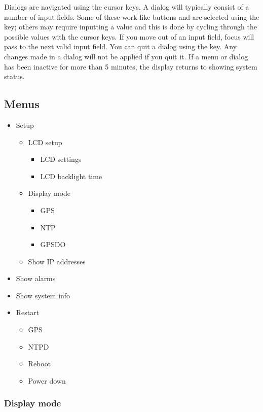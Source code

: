 Dialogs are navigated using the cursor keys. A dialog will typically consist of a number of input fields. Some of these work like buttons and are selected using the  key; others may require inputting a value and this is done by cycling through the possible values with the cursor keys. If you move out of an input field, focus will pass to the next valid input field. You can quit a dialog using the  key. Any changes made in a dialog will not be applied if you quit it. If a menu or dialog has been inactive for more than 5 minutes, the display returns
to showing system status.

\subsection{Menus}

\begin{itemize}
	\item Setup
		\begin{itemize}
			\item LCD setup
				\begin{itemize}
					\item LCD settings
					\item LCD backlight time
				\end{itemize}
			\item Display mode
				\begin{itemize}
					\item GPS
					\item NTP
					\item GPSDO
				\end{itemize}
			\item Show IP addresses
		\end{itemize}
		
	\item Show alarms
	\item Show system info
	\item Restart
		\begin{itemize}
			\item GPS
			\item NTPD
			\item Reboot
			\item Power down
		\end{itemize}
\end{itemize}

\subsubsection{Display mode}

